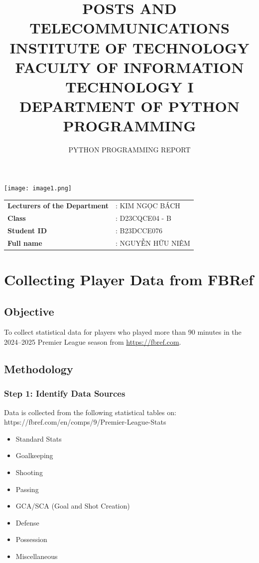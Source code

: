 \documentclass[12pt,a4paper]{article}
\title{POSTS AND TELECOMMUNICATIONS INSTITUTE OF TECHNOLOGY\\
FACULTY OF INFORMATION TECHNOLOGY I\\
DEPARTMENT OF PYTHON PROGRAMMING}
\author{PYTHON PROGRAMMING REPORT}
\date{}
\begin{document}
\maketitle

\begin{center}
\texttt{[image: image1.png]}
\end{center}

\begin{tabular}{ll}
\textbf{Lecturers of the Department} & : KIM NGỌC BÁCH \\
\textbf{Class} & : D23CQCE04 - B \\
\textbf{Student ID} & : B23DCCE076 \\
\textbf{Full name} & : NGUYỄN HỮU NIÊM \\
\end{tabular}

\newpage

\tableofcontents

\newpage

\section{Collecting Player Data from FBRef}

\subsection{Objective}
To collect statistical data for players who played more than 90 minutes in the 2024–2025 Premier League season from \url{https://fbref.com}.

\subsection{Methodology}

\subsubsection{Step 1: Identify Data Sources}
Data is collected from the following statistical tables on: https://fbref.com/en/comps/9/Premier-League-Stats
\begin{itemize}
\item Standard Stats
\item Goalkeeping
\item Shooting
\item Passing
\item GCA/SCA (Goal and Shot Creation)
\item Defense
\item Possession
\item Miscellaneous
\end{itemize}
\end{document}
